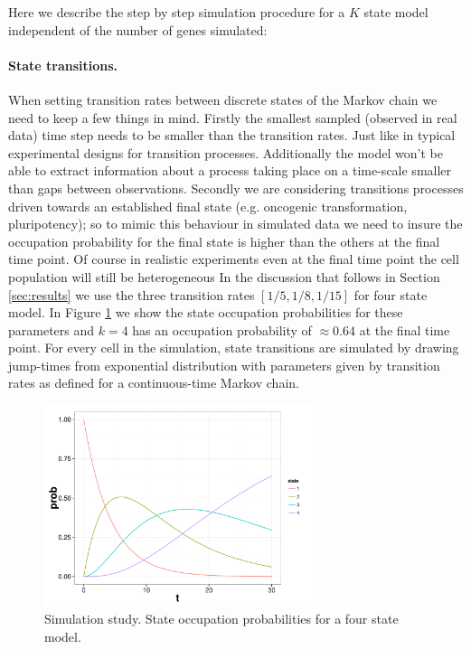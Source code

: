 Here we describe the step by step simulation procedure for a $K$ state model independent of the number of genes simulated:

\paragraph{State transitions.}
\label{sec:state-transitions}

When setting transition rates between discrete states of the Markov chain we need to keep a few things in mind. Firstly the smallest sampled (observed in real data) time step needs to be smaller than the transition rates. Just like in typical experimental designs for transition processes. Additionally the model won't be able to extract information about a process taking place on a time-scale smaller than gaps between observations. Secondly we are considering transitions processes driven towards an established final state (e.g. oncogenic transformation, pluripotency); so to mimic this behaviour in simulated data we need to insure the occupation probability for the final state is higher than the others at the final time point. Of course in realistic experiments even at the final time point the cell population will still be heterogeneous In the discussion that follows in Section \ref{sec:results} we use the three transition rates $[1/5, 1/8, 1/15]$ for four state model. In Figure \ref{fig:transition-rates} we show the state occupation probabilities for these parameters and $k=4$ has an occupation probability of $\approx 0.64$ at the final time point. For every cell in the simulation, state transitions are simulated by drawing jump-times from exponential distribution with parameters given by transition rates as defined for a continuous-time Markov chain.

\begin{figure}
  \centering
  \includegraphics[width=0.7\textwidth]{pics/trans-rates.pdf}
  \caption{Simulation study. State occupation probabilities for a four state model.}
  \label{fig:transition-rates}
\end{figure}


